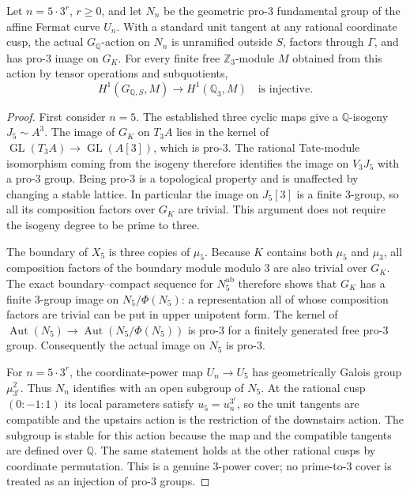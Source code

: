 \begin{lemma}
\label{lem:lm-five-power-action}
Let $n=5\cdot3^r$, $r\ge0$, and let $N_n$ be the geometric
pro-$3$ fundamental group of the affine Fermat curve $U_n$.
With a standard unit tangent at any rational coordinate cusp,
the actual $G_{\mathbb Q}$-action on $N_n$ is unramified
outside $S$, factors through $\Gamma$, and has pro-$3$
image on $G_K$.
For every finite free $\mathbb Z_3$-module $M$ obtained
from this action by tensor operations and subquotients,
\[
 H^1(G_{\mathbb Q,S},M)\longrightarrow H^1(\mathbb Q_3,M)
 \quad\text{is injective}.
\]
\end{lemma}
\begin{proof}
First consider $n=5$.  The established three cyclic maps
give a $\mathbb Q$-isogeny $J_5\sim A^3$.
The image of $G_K$ on $T_3A$ lies in the kernel of
$\operatorname{GL}(T_3A)\to\operatorname{GL}(A[3])$,
which is pro-$3$.  The rational Tate-module isomorphism
coming from the isogeny therefore identifies the image
on $V_3J_5$ with a pro-$3$ group.  Being pro-$3$ is a
topological property and is unaffected by changing a
stable lattice.  In particular the image on $J_5[3]$
is a finite $3$-group, so all its composition factors
over $G_K$ are trivial.  This argument does not require
the isogeny degree to be prime to three.

The boundary of $X_5$ is three copies of $\mu_5$.
Because $K$ contains both $\mu_5$ and $\mu_3$, all
composition factors of the boundary module modulo
$3$ are also trivial over $G_K$.
The exact boundary--compact sequence for $N_5^{\mathrm{ab}}$
therefore shows that $G_K$ has a finite $3$-group image
on $N_5/\Phi(N_5)$: a representation all of whose
composition factors are trivial can be put in upper
unipotent form.
The kernel of
$\operatorname{Aut}(N_5)\to\operatorname{Aut}(N_5/\Phi(N_5))$
is pro-$3$ for a finitely generated free pro-$3$ group.
Consequently the actual image on $N_5$ is pro-$3$.

For $n=5\cdot3^r$, the coordinate-power map $U_n\to U_5$
has geometrically Galois group $\mu_{3^r}^2$.
Thus $N_n$ identifies with an open subgroup of $N_5$.
At the rational cusp $(0:-1:1)$ its local parameters
satisfy $u_5=u_n^{3^r}$, so the unit tangents are
compatible and the upstairs action is the restriction
of the downstairs action.  The subgroup is stable for
this action because the map and the compatible tangents
are defined over $\mathbb Q$.
The same statement holds at the other rational cusps
by coordinate permutation.  This is a genuine
$3$-power cover; no prime-to-$3$ cover is treated as an
injection of pro-$3$ groups.


\end{proof}
